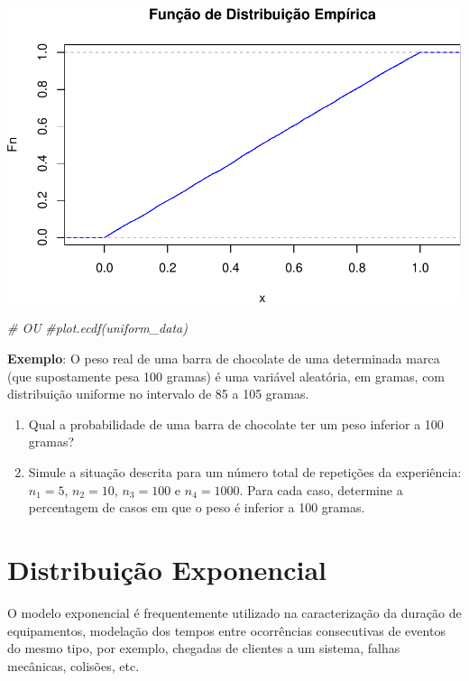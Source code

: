 \documentclass[
]{book}
\newenvironment{Shaded}{\begin{snugshade}}{\end{snugshade}}
\newcommand{\CommentTok}[1]{\textcolor[rgb]{0.56,0.35,0.01}{\textit{#1}}}
\begin{document}
\includegraphics{introR_files/figure-latex/unnamed-chunk-273-1.pdf}

\begin{Shaded}
\begin{Highlighting}[]
\CommentTok{\# OU}
\CommentTok{\#plot.ecdf(uniform\_data)}
\end{Highlighting}
\end{Shaded}

\textbf{Exemplo}: O peso real de uma barra de chocolate de uma determinada
marca (que supostamente pesa 100 gramas) é uma variável aleatória, em
gramas, com distribuição uniforme no intervalo de 85 a 105 gramas.

\begin{enumerate}
\def\labelenumi{(\alph{enumi})}
\item
  Qual a probabilidade de uma barra de chocolate ter um peso inferior
  a 100 gramas?
\item
  Simule a situação descrita para um número total de repetições da
  experiência: \(n_1=5\), \(n_2=10\), \(n_3=100\) e \(n_4=1000\). Para cada
  caso, determine a percentagem de casos em que o peso é inferior a
  100 gramas.
\end{enumerate}

\section{Distribuição Exponencial}\label{distribuiuxe7uxe3o-exponencial}

O modelo exponencial é frequentemente utilizado na caracterização da duração de equipamentos, modelação dos tempos entre ocorrências consecutivas de eventos do mesmo tipo, por exemplo, chegadas de clientes a um sistema, falhas mecânicas, colisões, etc.
\end{document}
